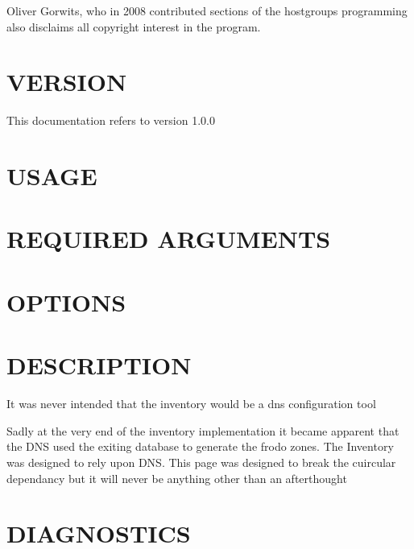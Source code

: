 \documentclass{book}
\begin{document}
Oliver Gorwits, who in 2008 contributed sections of the hostgroups programming also disclaims all copyright interest in the program.




\section{VERSION}
\label{_VERSION}
\hypertarget{_VERSION}{}



This documentation refers to version 1.0.0


\section{USAGE}
\label{_USAGE}
\hypertarget{_USAGE}{}


\section{REQUIRED ARGUMENTS}
\label{_REQUIRED_ARGUMENTS}
\hypertarget{_REQUIRED_ARGUMENTS}{}


\section{OPTIONS}
\label{_OPTIONS}
\hypertarget{_OPTIONS}{}


\section{DESCRIPTION}
\label{_DESCRIPTION}
\hypertarget{_DESCRIPTION}{}



It was never intended that the inventory would be a dns configuration tool



Sadly at the very end of the inventory implementation it became apparent that the DNS used the exiting database to generate the frodo zones. The Inventory was designed to rely upon DNS. This page was designed to break the cuircular dependancy but it will never be anything other than an afterthought


\section{DIAGNOSTICS}
\label{_DIAGNOSTICS}
\hypertarget{_DIAGNOSTICS}{}
\end{document}
